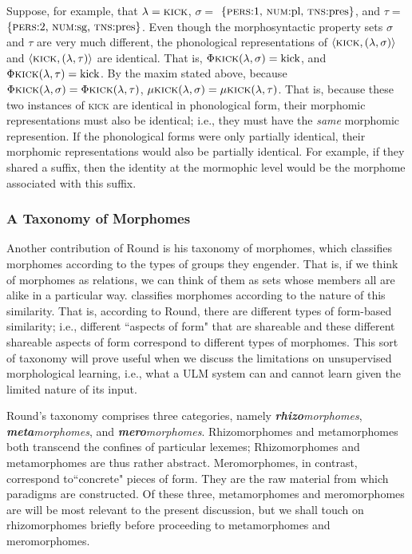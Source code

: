 Suppose, for example, that $\lambda = \textsc{kick}$, 
$\sigma =$ $\{\text{\textsc{pers}:1, \textsc{num}:pl, \textsc{tns}:pres} \}$, 
and $\tau =$ $\{\text{\textsc{pers}:2, \textsc{num}:sg, \textsc{tns}:pres}\}$.
Even though the morphosyntactic property sets $\sigma$ and $\tau$ are very much different,
the phonological representations of $\langle \textsc{kick}, (\lambda,\sigma) \rangle$
and $\langle \textsc{kick}, (\lambda,\tau) \rangle$ are identical. That is,
$\Phi{\textsc{kick}}(\lambda,\sigma) = \text{kick}$, and 
$\Phi{\textsc{kick}}(\lambda,\tau) = \text{kick}$. By the maxim stated above, because 
$\Phi{\textsc{kick}}(\lambda,\sigma) =  \Phi{\textsc{kick}}(\lambda,\tau)$, 
$\mu{\textsc{kick}}(\lambda,\sigma) = \mu{\textsc{kick}}(\lambda,\tau)$.
That is, because these two instances of \textsc{kick} are identical in 
phonological form, their morphomic representations must also be identical; 
i.e., they must have the \emph{same} morphomic represention. If the 
phonological forms were only partially identical, their morphomic 
representations would also be partially identical. For example, if they 
shared a suffix, then the identity at the mormophic level would 
be the morphome associated with this suffix.

\subsubsection{A Taxonomy of Morphomes}
Another contribution of Round is his taxonomy of morphomes, which 
classifies morphomes according to the types of groups they engender. 
That is, if we think of morphomes as relations, we can think of them as 
sets whose members all are alike in a particular way. \cite{round:2015, round:md:2016} 
classifies morphomes according to the nature of this similarity. That is, 
according to Round, there are different types of form-based similarity; i.e., different ``aspects of form" that are 
shareable \citep[][p.230]{round:md:2016} and these different shareable aspects of form correspond to different types of morphomes. 
This sort of taxonomy will prove useful when we discuss the 
limitations on unsupervised morphological learning, i.e., what a \ac{ULM} 
system can and cannot learn given the limited nature of its input.

Round's taxonomy comprises three categories, namely 
\textit{\textbf{rhizo}morphomes}, \textit{\textbf{meta}morphomes}, 
and \textit{\textbf{mero}morphomes}. 
Rhizomorphomes and metamorphomes both transcend the confines of 
particular lexemes; Rhizomorphomes and metamorphomes are thus 
rather abstract. Meromorphomes, in contrast, correspond to``concrete" 
pieces of form. They are the raw material from which paradigms are constructed. 
Of these three, metamorphomes and meromorphomes are will be most 
relevant to the present discussion, but we shall touch on rhizomorphomes briefly 
before proceeding to metamorphomes and meromorphomes.

